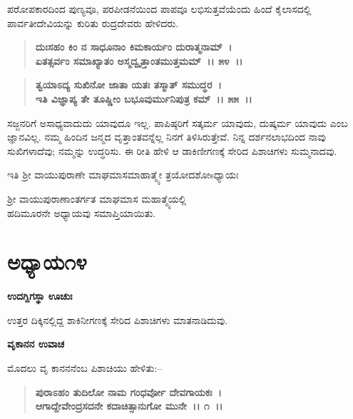 ಪರೋಪಕಾರದಿಂದ ಪುಣ್ಯವೂ, ಪರಪೀಡನೆಯಿಂದ ಪಾಪವೂ ಲಭಿಸುತ್ತವೆಯೆಂದು ಹಿಂದೆ ಕೈಲಾಸದಲ್ಲಿ ಪಾರ್ವತೀದೇವಿಯನ್ನು ಕುರಿತು ರುದ್ರದೇವರು ಹೇಳಿದರು.

\begin{verse}
\textbf{ದುಃಸಹಂ ಕಿಂ ನ ಸಾಧೂನಾಂ ಕಿಮಕಾರ್ಯಂ ದುರಾತ್ಮನಾಮ್~।}\\\textbf{ಏತತ್ಸರ್ವಂ ಸಮಾಖ್ಯಾತಂ ಅಸ್ಮದ್ವೃತ್ತಾಂತಮುತ್ತಮಮ್~।। ೫೪~।। }
\end{verse}

\begin{verse}
\textbf{ತ್ವಯಾಽದ್ಯ ಸುಖಿನೋ ಜಾತಾ ಯತಃ ತಸ್ಮಾತ್ ಸಮುದ್ಧರ~।}\\\textbf{ಇತಿ ವಿಜ್ಞಾಪ್ಯ ತೇ ತೂಷ್ಣೀಂ ಬಭೂವುರ್ಮುನಿಪುತ್ರ ಕಮ್~।। ೫೫~।।}
\end{verse}

ಸಜ್ಜನರಿಗೆ ಅಸಾಧ್ಯವಾದುದು ಯಾವುದೂ ಇಲ್ಲ. ಪಾಪಿಷ್ಠರಿಗೆ ಸತ್ಕರ್ಮ ಯಾವುದು, ದುಷ್ಕರ್ಮ ಯಾವುದು ಎಂಬ ಜ್ಞಾನವಿಲ್ಲ. ನಮ್ಮ ಹಿಂದಿನ ಜನ್ಮದ ವೃತ್ತಾಂತವನ್ನೆಲ್ಲ ನಿನಗೆ ತಿಳಿಸಿರುತ್ತೇವೆ. ನಿನ್ನ ದರ್ಶನಲಾಭದಿಂದ ನಾವು ಸುಖಿಗಳಾದೆವು; ನಮ್ಮನ್ನು ಉದ್ಧರಿಸು. ಈ ರೀತಿ ಹೇಳಿ ಆ ಡಾಕಿಣೀಗಣಕ್ಕೆ ಸೇರಿದ ಪಿಶಾಚಿಗಳು ಸುಮ್ಮನಾದವು.

\begin{center}
ಇತಿ ಶ‍್ರೀ ವಾಯುಪುರಾಣೇ ಮಾಘಮಾಸಮಾಹಾತ್ಮ್ಯೇ ತ್ರಯೋದಶೋsಧ್ಯಾಯಃ 
\end{center}

\begin{center}
ಶ‍್ರೀ ವಾಯುಪುರಾಣಾಂತರ್ಗತ ಮಾಘಮಾಸ ಮಹಾತ್ಮ್ಯೆಯಲ್ಲಿ\\ ಹದಿಮೂರನೇ ಅಧ್ಯಾಯವು ಸಮಾಪ್ತಿಯಾಯಿತು.
\end{center}

\newpage

\section*{ಅಧ್ಯಾಯ೧೪}

\emptypage

\begin{flushleft}
\textbf{ಉದಗ್ದಿಗಸ್ಥಾ ಊಚುಃ}
\end{flushleft}

ಉತ್ತರ ದಿಕ್ಕಿನಲ್ಲಿದ್ದ ಶಾಕಿನೀಗಣಕ್ಕೆ ಸೇರಿದ ಪಿಶಾಚಿಗಳು ಮಾತನಾಡಿದುವು.

\begin{flushleft}
\textbf{ವೃಕಾನನ ಉವಾಚ}
\end{flushleft}

ಮೊದಲು ವೃ ಕಾನನನೆಂಬ ಪಿಶಾಚಿಯು ಹೇಳಿತು:–

\begin{verse}
\textbf{ಪುರಾಽಹಂ ತುದಿಲೋ ನಾಮ ಗಂಧರ್ವೋ ದೇವಗಾಯಕಃ~।}\\\textbf{ಆಗಾದ್ದೇವೇಂದ್ರಸದನೇ ಕದಾಚಿತ್ಸಾನುಗೋ ಮುನೇ~।। ೧~।। }
\end{verse}

